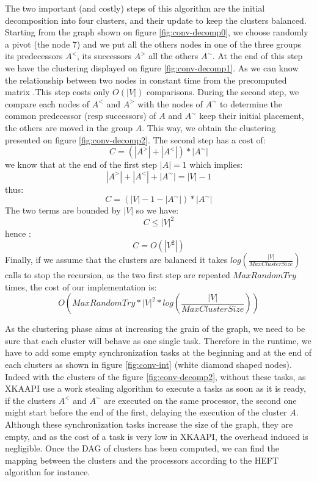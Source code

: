 \documentclass[10pt, conference, compsocconf,pdftex,dvipsnames]{IEEEtran}
\begin{document}
The two important (and costly) steps of this algorithm are the initial
decomposition into four clusters, and their update to keep the clusters
balanced.  Starting from the graph shown on figure \ref{fig:conv-decomp0}, we
choose randomly a pivot (the node $7$) and we put all the others nodes in one
of the three groups its predecessors $A^<$, its successors $A^>$ all the
others $A^{\sim}$. At the end of this step we have the clustering displayed on
figure \ref{fig:conv-decomp1}. As we can know the relationship between two
nodes in constant time from the precomputed matrix .This step costs only
$O(|V|)$ comparisons. During the second step, we compare each nodes of $A^<$
and $A^>$ with the nodes of $A^{\sim}$ to determine the common predecessor
(resp successors) of $A$ and $A^{\sim}$ keep their initial placement, the
others are moved in the group $A$.  This way, we obtain the clustering
presented on figure \ref{fig:conv-decomp2}. The second step has a cost of:
$$C=(|A^>|+|A^<|)*|A^{\sim}|$$ 
we know that at the end of the first step $|A|=1$ which implies: 
$$|A^>|+|A^<|+|A^{\sim}|=|V|-1$$
thus:
$$C=(|V|-1-|A^{\sim}|)*|A^{\sim}|$$ 
The two terms are bounded by $|V|$ so we have: 
$$C\leq|V|^2$$
hence :
$$C=O(|V^2|)$$ 
Finally, if we assume that the clusters are balanced it takes
$log\left(\frac{|V|}{MaxClusterSize}\right)$ calls to stop the recursion, as
the two first step are repeated $MaxRandomTry$ times, the
cost of our implementation is:
$$O\left(MaxRandomTry*|V|^2*log\left(\frac{|V|}{MaxClusterSize}\right)\right)$$

As the clustering phase aims at increasing the grain of the graph, we need to
be sure that each cluster will behave as one single task. Therefore in the
runtime, we have to add some empty synchronization tasks at the beginning and
at the end of each clusters as shown in figure \ref{fig:conv-int} (white
diamond shaped nodes). Indeed with the clusters of the figure
\ref{fig:conv-decomp2}, without these tasks,  as XKAAPI use a work stealing
algorithm to execute a tasks as soon as it is ready, if the clusters $A^<$ and
$A^{\sim}$ are executed on the same processor, the second one might start
before the end of the first, delaying the execution of the cluster $A$.
Although these synchronization tasks increase the size of the graph, they are
empty, and as the cost of a task is very low in XKAAPI, the overhead induced
is negligible. Once the DAG of clusters has been computed, we can find the
mapping between the clusters and the processors according to the HEFT
algorithm for instance. 
\end{document}
